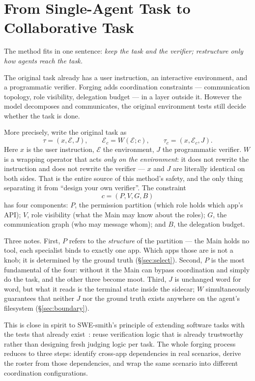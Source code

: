 \documentclass[11pt,a4paper]{article}
\begin{document}
\section{From Single-Agent Task to Collaborative Task}
\label{sec:wrap}

The method fits in one sentence: \emph{keep the task and the verifier; restructure only how agents reach the task.}

The original task already has a user instruction, an interactive environment, and a programmatic verifier. Forging adds coordination constraints --- communication topology, role visibility, delegation budget --- in a layer outside it. However the model decomposes and communicates, the original environment tests still decide whether the task is done.

More precisely, write the original task as
\[
  \tau=(x,\mathcal{E},J),
  \qquad
  \mathcal{E}_c=W(\mathcal{E};c),
  \qquad
  \tau_c=(x,\mathcal{E}_c,J).
\]
Here $x$ is the user instruction, $\mathcal{E}$ the environment, $J$ the programmatic verifier. $W$ is a wrapping operator that acts \emph{only on the environment}: it does not rewrite the instruction and does not rewrite the verifier --- $x$ and $J$ are literally identical on both sides. That is the entire source of this method's safety, and the only thing separating it from ``design your own verifier''. The constraint
\[
  c=(P,V,G,B)
\]
has four components: $P$, the permission partition (which role holds which app's API); $V$, role visibility (what the Main may know about the roles); $G$, the communication graph (who may message whom); and $B$, the delegation budget.

Three notes. First, $P$ refers to the \emph{structure} of the partition --- the Main holds no tool, each specialist binds to exactly one app. Which apps those are is not a knob; it is determined by the ground truth (\S\ref{sec:select}). Second, $P$ is the most fundamental of the four: without it the Main can bypass coordination and simply do the task, and the other three become moot. Third, $J$ is unchanged word for word, but what it reads is the terminal state inside the sidecar; $W$ simultaneously guarantees that neither $J$ nor the ground truth exists anywhere on the agent's filesystem (\S\ref{sec:boundary}).

This is close in spirit to SWE-smith's principle of extending software tasks with the tests that already exist~\cite{yang2025swesmith}: reuse verification logic that is already trustworthy rather than designing fresh judging logic per task. The whole forging process reduces to three steps: identify cross-app dependencies in real scenarios, derive the roster from those dependencies, and wrap the same scenario into different coordination configurations.
\end{document}
